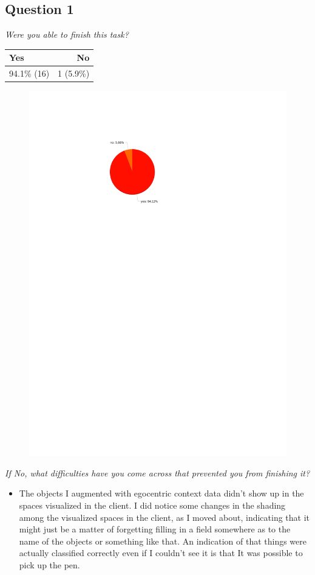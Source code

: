 \subsection{Question 1}\label{question2:1}
\emph{Were you able to finish this task?}
\begin{table}[H]
	\begin{center}
		\small \begin{tabular*}{0.35\columnwidth}{lr}
			\\ \hline \hline
			Yes & No \\ \hline \hline

		 	94.1\% (16) & 1 (5.9\%)\\ \hline
		\end{tabular*}
	\end{center}
\end{table}

\begin{figure}[H]
	\centering
	\includegraphics[width=0.5\linewidth]{gfx/Chapter_EvaluationResults/ChildproofTask/question1}
\end{figure}

\emph{If No, what difficulties have you come across that prevented you from finishing it?}
\begin{itemize}
	\item The objects I augmented with egocentric context data didn't show up in the spaces visualized in the client. I did notice some changes in the shading among the visualized spaces in the client, as I moved about, indicating that it might just be a matter of forgetting filling in a field somewhere as to the name of the objects or something like that. An indication of that things were actually classified correctly even if I couldn't see it is that It was possible to pick up the pen.
\end{itemize}

